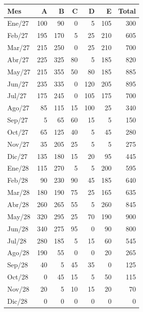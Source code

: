 \begin{tabular}{lr r r r r r}
\toprule
Mes & A & B & C & D & E & Total \\
\midrule
Ene/27 & 100 & 90 & 0 & 5 & 105 & 300 \\
Feb/27 & 195 & 170 & 5 & 25 & 210 & 605 \\
Mar/27 & 215 & 250 & 0 & 25 & 210 & 700 \\
Abr/27 & 225 & 325 & 80 & 5 & 185 & 820 \\
May/27 & 215 & 355 & 50 & 80 & 185 & 885 \\
Jun/27 & 235 & 335 & 0 & 120 & 205 & 895 \\
Jul/27 & 175 & 245 & 0 & 105 & 175 & 700 \\
Ago/27 & 85 & 115 & 15 & 100 & 25 & 340 \\
Sep/27 & 5 & 65 & 60 & 15 & 5 & 150 \\
Oct/27 & 65 & 125 & 40 & 5 & 45 & 280 \\
Nov/27 & 35 & 205 & 25 & 5 & 5 & 275 \\
Dic/27 & 135 & 180 & 15 & 20 & 95 & 445 \\
Ene/28 & 115 & 270 & 5 & 5 & 200 & 595 \\
Feb/28 & 90 & 230 & 90 & 45 & 185 & 640 \\
Mar/28 & 180 & 190 & 75 & 25 & 165 & 635 \\
Abr/28 & 260 & 265 & 55 & 5 & 260 & 845 \\
May/28 & 320 & 295 & 25 & 70 & 190 & 900 \\
Jun/28 & 340 & 275 & 95 & 0 & 90 & 800 \\
Jul/28 & 280 & 185 & 5 & 15 & 60 & 545 \\
Ago/28 & 190 & 55 & 0 & 0 & 20 & 265 \\
Sep/28 & 40 & 5 & 45 & 35 & 0 & 125 \\
Oct/28 & 0 & 45 & 15 & 5 & 50 & 115 \\
Nov/28 & 20 & 5 & 10 & 15 & 20 & 70 \\
Dic/28 & 0 & 0 & 0 & 0 & 0 & 0 \\
\bottomrule
\end{tabular}
